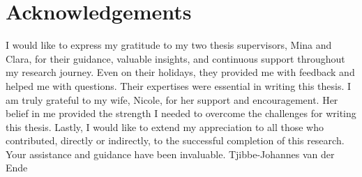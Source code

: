 \chapter*{Acknowledgements}

 I would like to express my gratitude to my two thesis supervisors, Mina and Clara, for their guidance, valuable insights, and continuous support throughout my research journey. Even on their holidays, they provided me with feedback and helped me with questions. Their expertises were essential in writing this thesis. \newline
I am truly grateful to my wife, Nicole, for her support and encouragement. 
Her belief in me provided the strength I needed to overcome the challenges for writing this thesis. \newline \newline
Lastly, I would like to extend my appreciation to all those who contributed, directly or indirectly, to the successful completion of this research. Your assistance and guidance have been invaluable. \newline \newline
Tjibbe-Johannes van der Ende